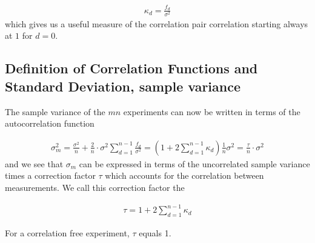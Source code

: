 \documentclass[letterpaper,10pt,english]{sphinxmanual}
\begin{document}
\begin{equation*}
\begin{split}
\begin{equation}
\kappa_d = \frac{f_d}{\sigma^2}
\label{eq:autocorrelformal} \tag{9}
\end{equation}
\end{split}
\end{equation*}
which gives us a useful measure of the correlation pair correlation
starting always at \(1\) for \(d=0\).


\subsection{Definition of Correlation Functions and Standard Deviation, sample variance}
\label{\detokenize{chapter3:definition-of-correlation-functions-and-standard-deviation-sample-variance}}
The sample variance of the \(mn\) experiments can now be
written in terms of the autocorrelation function




\begin{equation*}
\begin{split}
\begin{equation}
\sigma_m^2=\frac{\sigma^2}{n}+\frac{2}{n}\cdot\sigma^2\sum_{d=1}^{n-1}
\frac{f_d}{\sigma^2}=\left(1+2\sum_{d=1}^{n-1}\kappa_d\right)\frac{1}{n}\sigma^2=\frac{\tau}{n}\cdot\sigma^2
\label{eq:error_estimate_corr_time} \tag{10}
\end{equation}
\end{split}
\end{equation*}
and we see that \(\sigma_m\) can be expressed in terms of the
uncorrelated sample variance times a correction factor \(\tau\) which
accounts for the correlation between measurements. We call this
correction factor the 




\begin{equation*}
\begin{split}
\begin{equation}
\tau = 1+2\sum_{d=1}^{n-1}\kappa_d
\label{eq:autocorrelation_time} \tag{11}
\end{equation}
\end{split}
\end{equation*}




For a correlation free experiment, \(\tau\)
equals 1.
\end{document}
